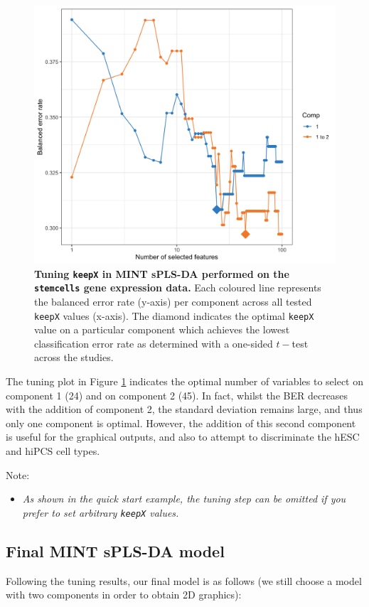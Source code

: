 \documentclass[]{book}
\providecommand{\tightlist}{%
  \setlength{\itemsep}{0pt}\setlength{\parskip}{0pt}}
\begin{document}
\begin{figure}

{\centering \includegraphics[width=0.5\linewidth]{Figures/MINT/MINT-tune-1} 

}

\caption{\textbf{Tuning \texttt{keepX} in MINT sPLS-DA performed on the \texttt{stemcells} gene expression data.} Each coloured line represents the balanced error rate (y-axis) per component across all tested \texttt{keepX} values (x-axis). The diamond indicates the optimal \texttt{keepX} value on a particular component which achieves the lowest classification error rate as determined with a one-sided \(t-\)test across the studies.}\label{fig:MINT-tune}
\end{figure}



The tuning plot in Figure \ref{fig:MINT-tune} indicates the optimal number of variables to select on component 1 (24) and on component 2 (45). In fact, whilst the BER decreases with the addition of component 2, the standard deviation remains large, and thus only one component is optimal. However, the addition of this second component is useful for the graphical outputs, and also to attempt to discriminate the hESC and hiPCS cell types.

Note:

\begin{itemize}
\tightlist
\item
  \emph{As shown in the quick start example, the tuning step can be omitted if you prefer to set arbitrary \texttt{keepX} values.}
\end{itemize}

\hypertarget{final-mint-spls-da-model}{%
\subsection{Final MINT sPLS-DA model}\label{final-mint-spls-da-model}}

Following the tuning results, our final model is as follows (we still choose a model with two components in order to obtain 2D graphics):
\end{document}
